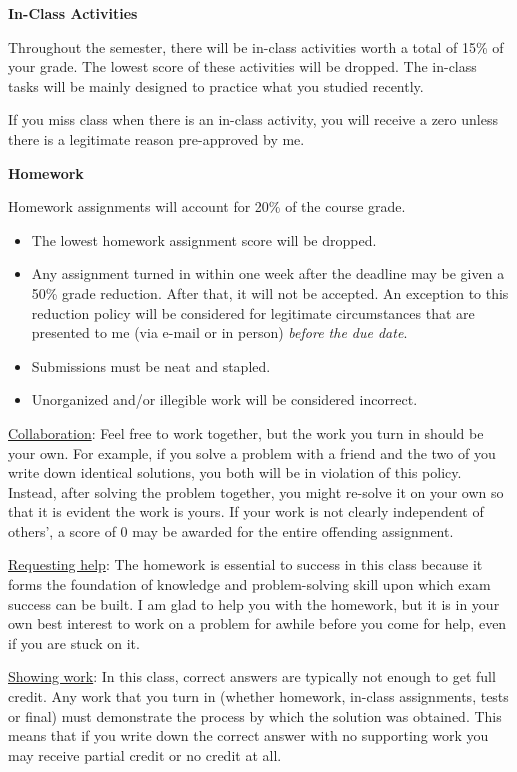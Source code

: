 \documentclass{article}
\begin{document}
\textbf{\large In-Class Activities}\medskip

Throughout the semester, there will be in-class activities worth a total of 15\% of your grade. The lowest score of these activities will be dropped. The in-class tasks will be mainly designed to practice what you studied recently.

If you miss class when there is an in-class activity, you will receive a zero unless there is a legitimate reason pre-approved by me.\bigskip

\textbf{\large Homework}\medskip

Homework assignments will account for 20\% of the course grade.\medskip
\begin{itemize}
    \item The lowest homework assignment score will be dropped.
    \item Any assignment turned in within one week after the deadline may be given a 50\% grade reduction. After that, it will not be accepted. An exception to this reduction policy will be considered for legitimate circumstances that are presented to me (via e-mail or in person) \textit{before the due date}. 
    \item Submissions must be neat and stapled.
    \item Unorganized and/or illegible work will be considered incorrect.
\end{itemize}\medskip

\ul{Collaboration}: Feel free to work together, but the work you turn in should be your own. For example, if you solve a problem with a friend and the two of you write down identical solutions, you both will be in violation of this policy. Instead, after solving the problem together, you might re-solve it on your own so that it is evident the work is yours. If your work is not clearly independent of others', a score of 0 may be awarded for the entire offending assignment.\medskip

\newpage

\ul{Requesting help}: The homework is essential to success in this class because it forms the foundation of knowledge and problem-solving skill upon which exam success can be built. I am glad to help you with the homework, but it is in your own best interest to work on a problem for awhile before you come for help, even if you are stuck on it.\medskip

\ul{Showing work}: In this class, correct answers are typically not enough to get full credit. Any work that you turn in (whether homework, in-class assignments, tests or final) must demonstrate the process by which the solution was obtained. This means that if you write down the correct answer with no supporting work you may receive partial credit or no credit at all.\bigskip
\end{document}
